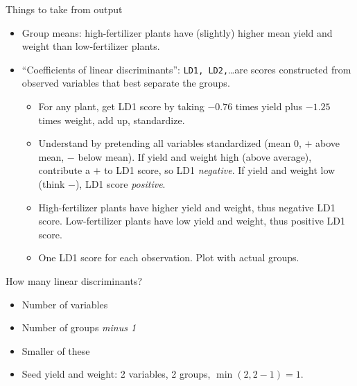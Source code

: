 \documentclass[unknownkeysallowed]{beamer}\usepackage[]{graphicx}\usepackage[]{color}
\begin{document}
\begin{frame}[fragile]{Things to take from output}
  
  \begin{itemize}
  \item Group means: high-fertilizer plants have (slightly) higher
    mean yield and weight than low-fertilizer plants.
  \item ``Coefficients of linear discriminants'': \texttt{LD1,
      LD2,}\ldots are scores constructed from observed variables that
    best separate the groups.
    \begin{itemize}
    \item For any plant, get LD1 score by taking $-0.76$ times yield
      plus $-1.25$ times weight, add up, standardize.
    \item Understand by pretending all variables standardized (mean 0,
      $+$ above mean, $-$ below mean). If yield and weight high (above
      average), contribute a $+$ to LD1 score, so LD1
      \emph{negative}. If yield and weight low (think $-$), LD1 score
      \emph{positive}.
    \item High-fertilizer plants have higher yield and weight, thus
      negative LD1 score. Low-fertilizer plants have low yield and
      weight, thus positive LD1 score.
    \item One LD1 score for each observation. Plot with actual groups.
    \end{itemize}
  \end{itemize}
  
\end{frame}

\begin{frame}[fragile]{How many linear discriminants?}
    
    \begin{itemize}
    \item Number of variables
    \item Number of groups \emph{minus 1}
    \item Smaller of these
    \item Seed yield and weight: 2 variables, 2 groups,
      $\min(2,2-1)=1$. 
    \end{itemize}
  
\end{frame}
\end{document}
